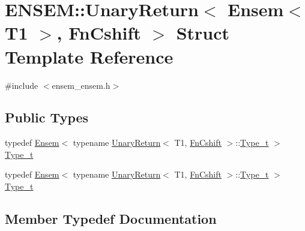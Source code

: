 \hypertarget{structENSEM_1_1UnaryReturn_3_01Ensem_3_01T1_01_4_00_01FnCshift_01_4}{}\section{E\+N\+S\+EM\+:\+:Unary\+Return$<$ Ensem$<$ T1 $>$, Fn\+Cshift $>$ Struct Template Reference}
\label{structENSEM_1_1UnaryReturn_3_01Ensem_3_01T1_01_4_00_01FnCshift_01_4}


{\ttfamily \#include $<$ensem\+\_\+ensem.\+h$>$}

\subsection*{Public Types}
\begin{DoxyCompactItemize}
\item 
typedef \mbox{\hyperlink{classENSEM_1_1Ensem}{Ensem}}$<$ typename \mbox{\hyperlink{structENSEM_1_1UnaryReturn}{Unary\+Return}}$<$ T1, \mbox{\hyperlink{structENSEM_1_1FnCshift}{Fn\+Cshift}} $>$\+::\mbox{\hyperlink{structENSEM_1_1UnaryReturn_3_01Ensem_3_01T1_01_4_00_01FnCshift_01_4_a1adec9b456e13e2aebde180312ff6235}{Type\+\_\+t}} $>$ \mbox{\hyperlink{structENSEM_1_1UnaryReturn_3_01Ensem_3_01T1_01_4_00_01FnCshift_01_4_a1adec9b456e13e2aebde180312ff6235}{Type\+\_\+t}}
\item 
typedef \mbox{\hyperlink{classENSEM_1_1Ensem}{Ensem}}$<$ typename \mbox{\hyperlink{structENSEM_1_1UnaryReturn}{Unary\+Return}}$<$ T1, \mbox{\hyperlink{structENSEM_1_1FnCshift}{Fn\+Cshift}} $>$\+::\mbox{\hyperlink{structENSEM_1_1UnaryReturn_3_01Ensem_3_01T1_01_4_00_01FnCshift_01_4_a1adec9b456e13e2aebde180312ff6235}{Type\+\_\+t}} $>$ \mbox{\hyperlink{structENSEM_1_1UnaryReturn_3_01Ensem_3_01T1_01_4_00_01FnCshift_01_4_a1adec9b456e13e2aebde180312ff6235}{Type\+\_\+t}}
\end{DoxyCompactItemize}


\subsection{Member Typedef Documentation}
\mbox{\label{structENSEM_1_1UnaryReturn_3_01Ensem_3_01T1_01_4_00_01FnCshift_01_4_a1adec9b456e13e2aebde180312ff6235}} 

